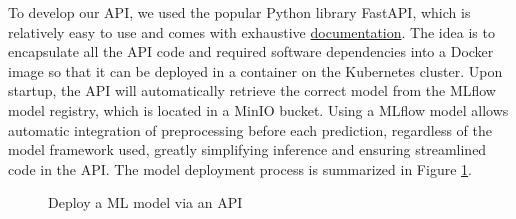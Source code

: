 To develop our API, we used the popular Python library FastAPI, which is relatively easy to use and comes with exhaustive \href{https://fastapi.tiangolo.com/}{documentation}. The idea is to encapsulate all the API code and required software dependencies into a Docker image so that it can be deployed in a container on the Kubernetes cluster. Upon startup, the API will automatically retrieve the correct model from the MLflow model registry, which is located in a MinIO bucket. Using a MLflow model allows automatic integration of preprocessing before each prediction, regardless of the model framework used, greatly simplifying inference and ensuring streamlined code in the API. The model deployment process is summarized in Figure \ref{fig:api-with-mlflow}.

\begin{figure}[htbp]
    \centering
    \caption{Deploy a ML model via an API}
    \label{fig:api-with-mlflow}
\end{figure}


